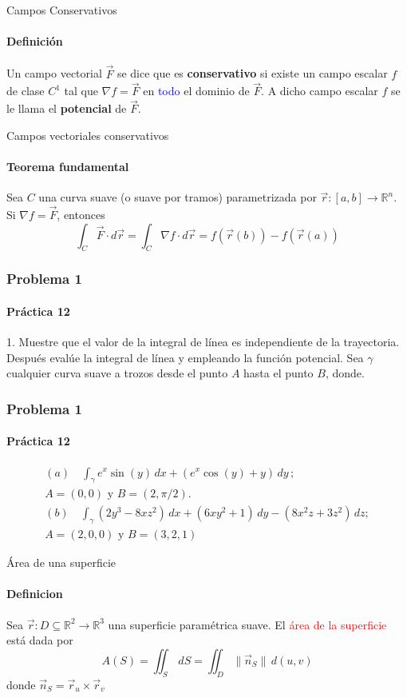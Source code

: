 \documentclass{plantillaPPT}
\begin{document}
\primeraDiapo

\begin{frame}{Campos Conservativos}
\framesubtitle{Definición}


\begin{definicion}
    Un campo vectorial $\vec{F}$ se dice que es \textbf{conservativo} si existe un campo escalar $f$ de clase $C^1$ tal que {\color{red} $\nabla f = \vec{F}$} en \textcolor{blue}{todo} el dominio de $\vec{F}$. A dicho campo escalar $f$ se le llama el \textbf{potencial} de $\vec{F}$.    
\end{definicion}
    
\end{frame}

\begin{frame}{Campos vectoriales conservativos}
    \framesubtitle{Teorema fundamental}
    \begin{teorema}
        Sea $C$ una curva suave (o suave por tramos) parametrizada por $\vec{r}:[a,b]\to\mathbb{R}^n$.
        Si $\nabla f = \vec{F}$, entonces
        \begin{equation*}
            \int_C \vec{F}\cdot d\vec{r} = \boxed{\int_C \nabla f\cdot d\vec{r} = f(\vec{r}(b)) - f(\vec{r}(a))}
        \end{equation*}
    \end{teorema}
\end{frame}

\begin{frame}
    \frametitle{Problema 1}
    \framesubtitle{Práctica 12}
    1. Muestre que el valor de la integral de línea es independiente de la trayectoria. Después evalúe la integral de línea y empleando la función potencial. Sea $\gamma$ cualquier curva suave a trozos desde el punto $A$ hasta el punto $B$, donde.
\end{frame}
\begin{frame}
    \frametitle{Problema 1}
    \framesubtitle{Práctica 12}
    \begin{gather*}
        (a)\quad \int_\gamma e^x\sin(y)\,dx+(e^x\cos(y)+y)\,dy\,; \\ A=(0,0) \text{ y } B=(2, \pi/2). \\[30pt]
    (b) \quad \int_\gamma (2y^3-8xz^2)\,dx + (6xy^2+1)\,dy -    (8x^2z+3z^2)\,dz; \\  A=(2,0,0) \text{ y }B=(3, 2, 1)
    \end{gather*}
\end{frame}



\begin{frame}{Área de una superficie}
    \framesubtitle{Definicion}

    \begin{definicion}

    Sea $\vec{r}:D\subseteq\mathbb{R}^2\to\mathbb{R}^3$ una superficie paramétrica suave. El \textcolor{red}{área de la superficie} está dada por
    \begin{equation*}
        A(S) =\iint_S\,dS = \iint_D \|\vec{n}_S\|\,d(u,v)
    \end{equation*}
    donde $\vec{n}_S = \vec{r}_u \times \vec{r}_v $
    \end{definicion}
\end{frame}
\end{document}
